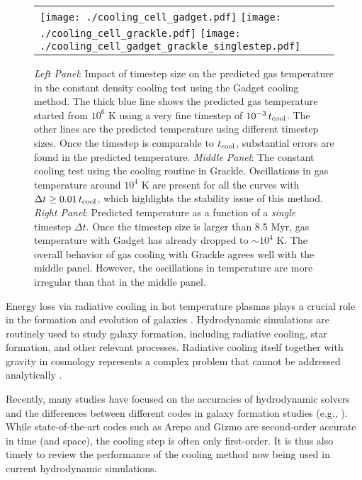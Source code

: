 \documentclass[a4paper,fleqn,usenatbib,useAMS, twocolumn]{mnras}
\begin{document}
\begin{figure*}
\begin{center}
\begin{tabular}{lll}
\texttt{[image: ./cooling\_cell\_gadget.pdf]}
\texttt{[image: ./cooling\_cell\_grackle.pdf]}
\texttt{[image: ./cooling\_cell\_gadget\_grackle\_singlestep.pdf]}\\
\end{tabular}
\caption{\label{fig:cooling_cell_grackle} \textit{Left Panel}: Impact of timestep size 
on the predicted gas temperature in the constant density 
cooling test using the {\sc Gadget} cooling method.
The thick blue line shows the predicted gas temperature
started from $10^6$ K using a very fine timestep of $10^{-3}\, t_{\rm cool}$. The other lines are the
predicted temperature using different timestep sizes. Once the timestep is comparable to 
$t_{\rm cool}$, substantial errors are found in the predicted temperature. 
\textit{Middle Panel}: The constant cooling test using the cooling routine in {\sc Grackle}. 
Oscillations in gas temperature around $10^4$ K are present for all the curves with 
$\Delta t \ge 0.01\, t_{\rm cool}$, which highlights the stability issue of this method.
\textit{Right Panel}: Predicted temperature as a function of a \textit{single} timestep $\Delta t$.
Once the timestep size is larger than 8.5 Myr, gas temperature
with {\sc Gadget} has already dropped to $\sim 10^4$ K. The overall behavior of gas cooling
with {\sc Grackle} agrees well with the middle panel. However, the oscillations in temperature
are more irregular than that in the middle panel.}
\end{center}
\end{figure*}


Energy loss via radiative cooling in hot temperature plasmas plays a
crucial role in the formation and evolution of galaxies
\citep{Blumenthal1984}. Hydrodynamic simulations are routinely used to
study galaxy formation, including radiative cooling, star formation,
and other relevant processes.  Radiative cooling itself together with
gravity in cosmology represents a complex problem that cannot be
addressed analytically \citep[e.g.][]{Birnboim2003, Keres2005,
  Nelson2016}.

Recently, many studies have focused on the accuracies of hydrodynamic
solvers \citep{Arepo, Bauer2012, Gizmo, Zhu2015} and the differences
between different codes in galaxy formation studies (e.g.,
\citealt{Sijacki2012, Keres2012, Vogelsberger2012, Torrey2012,
Nelson2013, Zhu2016}). While state-of-the-art codes such as 
{\sc Arepo} and {\sc Gizmo} are second-order accurate in time (and
space), the cooling step is often only first-order.  It is thus also
timely to review the performance of the cooling method now being used in
current hydrodynamic simulations.
\end{document}
